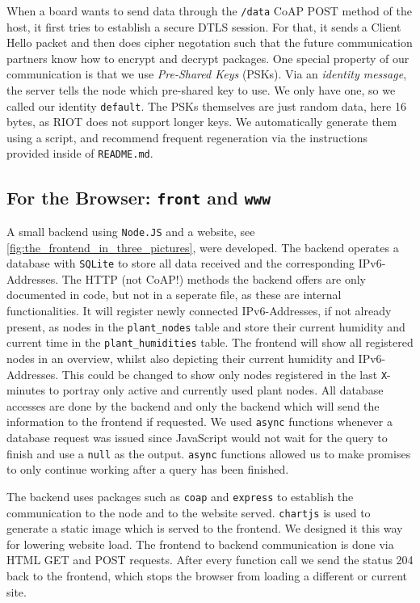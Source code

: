 \documentclass[acmtog, language=english, nonacm]{acmart}
\begin{document}
    When a board wants to send data through the \texttt{/data} CoAP POST method of the host, it first tries to establish a secure DTLS session. For that, it sends a Client Hello packet and then does cipher negotation such that the future communication partners know how to encrypt and decrypt packages. One special property of our communication is that we use \emph{Pre-Shared Keys} (PSKs). Via an \emph{identity message}, the server tells the node which pre-shared key to use. We only have one, so we called our identity \texttt{default}. The PSKs themselves are just random data, here 16 bytes, as RIOT does not support longer keys. We automatically generate them using a script, and recommend frequent regeneration via the instructions provided inside of \texttt{README.md}.

    \subsection{For the Browser: \texttt{front} and \texttt{www}}

    A small backend using \texttt{Node.JS} and a website, see \cref*{fig:the_frontend_in_three_pictures}, were developed. The backend operates a database with \texttt{SQLite} to store all data received and the corresponding IPv6-Addresses. The HTTP (not CoAP!) methods the backend offers are only documented in code, but not in a seperate file, as these are internal functionalities. It will register newly connected IPv6-Addresses, if not already present, as nodes in the \texttt{plant\_nodes} table and store their current humidity and current time in the \texttt{plant\_humidities} table. The frontend will show all registered nodes in an overview, whilst also depicting their current humidity and IPv6-Addresses. This could be changed to show only nodes registered in the last \texttt{X}-minutes to portray only active and currently used plant nodes. All database accesses are done by the backend and only the backend which will send the information to the frontend if requested. We used \texttt{async} functions whenever a database request was issued since JavaScript would not wait for the query to finish and use a \texttt{null} as the output. \texttt{async} functions allowed us to make promises to only continue working after a query has been finished. 

    The backend uses packages such as \texttt{coap} and \texttt{express} to establish the communication to the node and to the website served. \texttt{chartjs} is used to generate a static image which is served to the frontend. We designed it this way for lowering website load. The frontend to backend communication is done via HTML GET and POST requests. After every function call we send the status 204 back to the frontend, which stops the browser from loading a different or current site.
    
\end{document}
